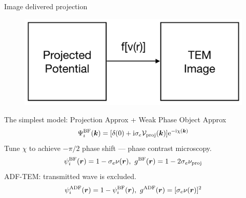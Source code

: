 \documentclass[slidestop,compress,12pt]{beamer}
\newcommand{\im}{\mathrm{i}}
\newcommand{\ee}{\mathrm{e}}
\begin{document}
\begin{frame}{Image delivered projection}
    \vspace{-0.5cm}
    \begin{figure}
        \includegraphics[scale=0.2]{imgs/TEM_black_box.png}
    \end{figure}
    \vspace{-0.5cm}
    The simplest model: Projection Approx + Weak Phase Object Approx
    \begin{equation}
            \Psi_{i}^{\text{BF}}(\bm{k}) = [\delta(0) + \im\sigma_e \mathcal{V}_{\text{proj}}(\bm{k})] \ee^{-\im \chi (\bm{k})} \notag 
    \end{equation}
    Tune $\chi$ to achieve $-\pi/2$ phase shift --- phase contrast microscopy.
    \begin{equation}
        \psi^{\text{BF}}_i (\bm{r}) = 1-\sigma_e \nu(\bm{r}) ,\ 
        g^{\text{BF}}(\bm{r}) = 1-2\sigma_e\nu_{\text{proj}} \notag
    \end{equation}
    ADF-TEM: transmitted wave is excluded.
    \begin{equation}
        \psi^{\text{ADF}}_i(\bm{r}) = 1 - \psi^{\text{BF}}_i(\bm{r}) ,\ 
        g^{\text{ADF}}(\bm{r}) = [\sigma_e \nu(\bm{r})]^2 \notag
    \end{equation}
\end{frame}
\end{document}
